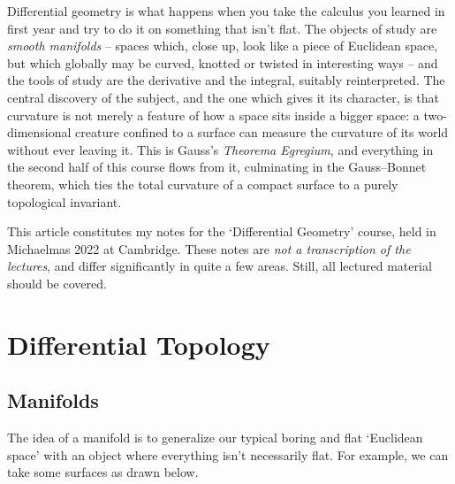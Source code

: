 



Differential geometry is what happens when you take the calculus you learned in first year and try to do it on something that isn't flat. The objects of study are \emph{smooth manifolds} -- spaces which, close up, look like a piece of Euclidean space, but which globally may be curved, knotted or twisted in interesting ways -- and the tools of study are the derivative and the integral, suitably reinterpreted. The central discovery of the subject, and the one which gives it its character, is that curvature is not merely a feature of how a space sits inside a bigger space: a two-dimensional creature confined to a surface can measure the curvature of its world without ever leaving it. This is Gauss's \emph{Theorema Egregium}, and everything in the second half of this course flows from it, culminating in the Gauss--Bonnet theorem, which ties the total curvature of a compact surface to a purely topological invariant.

This article constitutes my notes for the `Differential Geometry' course, held in Michaelmas 2022 at Cambridge. These notes are \emph{not a transcription of the lectures}, and differ significantly in quite a few areas. Still, all lectured material should be covered.



\section{Differential Topology}

\subsection{Manifolds}

The idea of a manifold is to generalize our typical boring and flat `Euclidean space' with an object where everything isn't necessarily flat. For example, we can take some surfaces as drawn below. 


